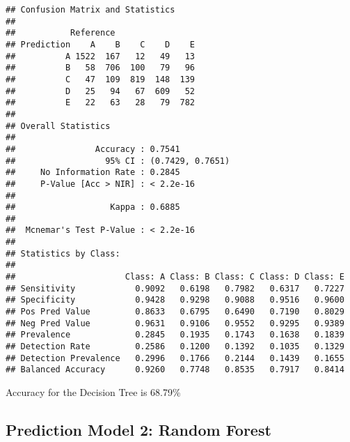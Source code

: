 \documentclass[
]{article}
\newenvironment{Shaded}{\begin{snugshade}}{\end{snugshade}}
\newcommand{\CommentTok}[1]{\textcolor[rgb]{0.56,0.35,0.01}{\textit{#1}}}
\newcommand{\DataTypeTok}[1]{\textcolor[rgb]{0.13,0.29,0.53}{#1}}
\newcommand{\KeywordTok}[1]{\textcolor[rgb]{0.13,0.29,0.53}{\textbf{#1}}}
\newcommand{\NormalTok}[1]{#1}
\newcommand{\OperatorTok}[1]{\textcolor[rgb]{0.81,0.36,0.00}{\textbf{#1}}}
\newcommand{\StringTok}[1]{\textcolor[rgb]{0.31,0.60,0.02}{#1}}
\begin{document}
\begin{verbatim}
## Confusion Matrix and Statistics
## 
##           Reference
## Prediction    A    B    C    D    E
##          A 1522  167   12   49   13
##          B   58  706  100   79   96
##          C   47  109  819  148  139
##          D   25   94   67  609   52
##          E   22   63   28   79  782
## 
## Overall Statistics
##                                           
##                Accuracy : 0.7541          
##                  95% CI : (0.7429, 0.7651)
##     No Information Rate : 0.2845          
##     P-Value [Acc > NIR] : < 2.2e-16       
##                                           
##                   Kappa : 0.6885          
##                                           
##  Mcnemar's Test P-Value : < 2.2e-16       
## 
## Statistics by Class:
## 
##                      Class: A Class: B Class: C Class: D Class: E
## Sensitivity            0.9092   0.6198   0.7982   0.6317   0.7227
## Specificity            0.9428   0.9298   0.9088   0.9516   0.9600
## Pos Pred Value         0.8633   0.6795   0.6490   0.7190   0.8029
## Neg Pred Value         0.9631   0.9106   0.9552   0.9295   0.9389
## Prevalence             0.2845   0.1935   0.1743   0.1638   0.1839
## Detection Rate         0.2586   0.1200   0.1392   0.1035   0.1329
## Detection Prevalence   0.2996   0.1766   0.2144   0.1439   0.1655
## Balanced Accuracy      0.9260   0.7748   0.8535   0.7917   0.8414
\end{verbatim}

Accuracy for the Decision Tree is 68.79\%

\hypertarget{prediction-model-2-random-forest}{%
\subsection{Prediction Model 2: Random
Forest}\label{prediction-model-2-random-forest}}

\begin{Shaded}
\end{Shaded}
\end{document}
